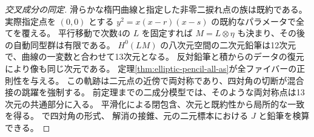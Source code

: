 \begin{proof}[交叉成分の同定]
滑らかな楕円曲線と指定した非零二捩れ点の族は既約である。
実際指定点を $(0,0)$ とする $y^2=x(x-r)(x-s)$ の既約なパラメータで全てを覆える。
平行移動で次数4の $L$ を固定すれば $M=L\otimes\eta$ も決まり、その後の自動同型群は有限である。
$H^0(LM)$ の八次元空間の二次元鉛筆は12次元で、曲線の一変数と合わせて13次元となる。
反対鉛筆と積からのデータの復元により像も同じ次元である。
定理\ref{thm:elliptic-pencil-all-as}が全ファイバーの正則性を与える。
この軌跡は二元点の近傍で両対称であり、四対角の切断が混合接の跳躍を強制する。
前定理までの二成分模型では、そのような両対称点は13次元の共通部分に入る。
平滑化による閉包含、次元と既約性から局所的な一致を得る。
で四対角の形式、
解消の接錐、元の二元標本における $J$ と鉛筆を検算できる。
\end{proof}
